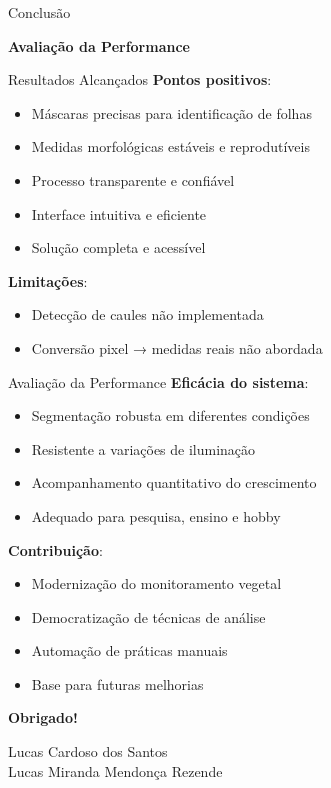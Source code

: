 \documentclass[landscape, 12pt]{beamer}
\begin{document}
\begin{frame}{Conclusão}
    \begin{center}
        \textbf{Avaliação da Performance}
    \end{center}
\end{frame}

\begin{frame}{Resultados Alcançados}
    \textbf{Pontos positivos}:
    \begin{itemize}
        \item Máscaras precisas para identificação de folhas
        \item Medidas morfológicas estáveis e reprodutíveis
        \item Processo transparente e confiável
        \item Interface intuitiva e eficiente
        \item Solução completa e acessível
    \end{itemize}
    
    \vspace{0.5cm}
    \textbf{Limitações}:
    \begin{itemize}
        \item Detecção de caules não implementada
        \item Conversão pixel → medidas reais não abordada
    \end{itemize}
\end{frame}

\begin{frame}{Avaliação da Performance}
    \textbf{Eficácia do sistema}:
    \begin{itemize}
        \item Segmentação robusta em diferentes condições
        \item Resistente a variações de iluminação
        \item Acompanhamento quantitativo do crescimento
        \item Adequado para pesquisa, ensino e hobby
    \end{itemize}
    
    \vspace{0.5cm}
    \textbf{Contribuição}:
    \begin{itemize}
        \item Modernização do monitoramento vegetal
        \item Democratização de técnicas de análise
        \item Automação de práticas manuais
        \item Base para futuras melhorias
    \end{itemize}
\end{frame}

\begin{frame}{}
    \vspace{0.8cm}
    \begin{center}
        \textbf{Obrigado!}
        
        \vspace{0.3cm}
        Lucas Cardoso dos Santos \\
        Lucas Miranda Mendonça Rezende
    \end{center}
\end{frame}
\end{document}
